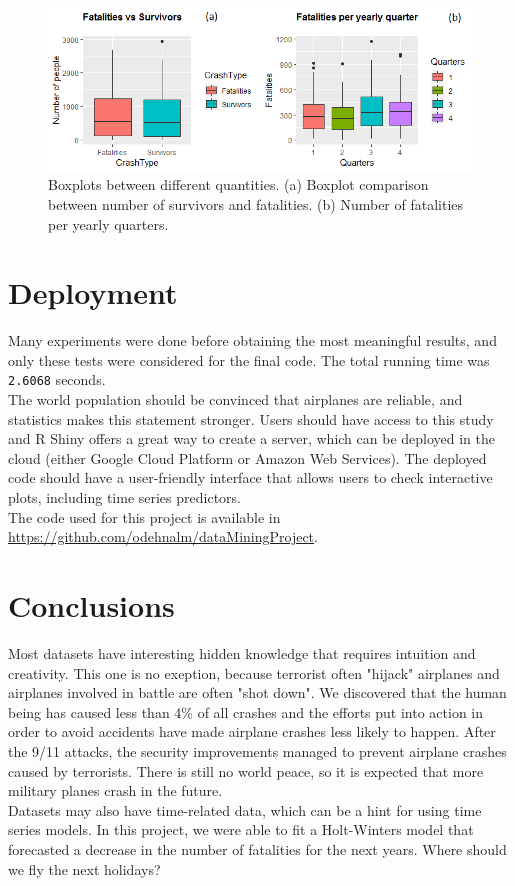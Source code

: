 \documentclass[12pt]{article}
\begin{document}
\begin{figure}[H]
	\centering
	\includegraphics[width=1\linewidth]{boxPlots}
	\caption{Boxplots between different quantities. (a) Boxplot comparison between number of survivors and fatalities. (b) Number of fatalities per yearly quarters.}
	\label{fig:equalityPlot}
\end{figure}

\section{Deployment}

Many experiments were done before obtaining the most meaningful results, and only these tests were considered for the final code. The total running time was \texttt{2.6068} seconds.\\

The world population should be convinced that airplanes are reliable, and statistics makes this statement stronger. Users should have access to this study and R Shiny offers a great way to create a server, which can be deployed in the cloud (either Google Cloud Platform or Amazon Web Services). The deployed code should have a user-friendly interface that allows users to check interactive plots, including time series predictors.\\

The code used for this project is available in \url{https://github.com/odehnalm/dataMiningProject}.

\section*{Conclusions}

Most datasets have interesting hidden knowledge that requires intuition and creativity. This one is no exeption, because terrorist often "hijack" airplanes and airplanes involved in battle are often "shot down". We discovered that the human being has caused less than 4\% of all crashes and the efforts put into action in order to avoid accidents have made airplane crashes less likely to happen. After the 9/11 attacks, the security improvements managed to prevent airplane crashes caused by terrorists. There is still no world peace, so it is expected that more military planes crash in the future.\\

Datasets may also have time-related data, which can be a hint for using time series models. In this project, we were able to fit a Holt-Winters model that forecasted a decrease in the number of fatalities for the next years. Where should we fly the next holidays?



\end{document}
